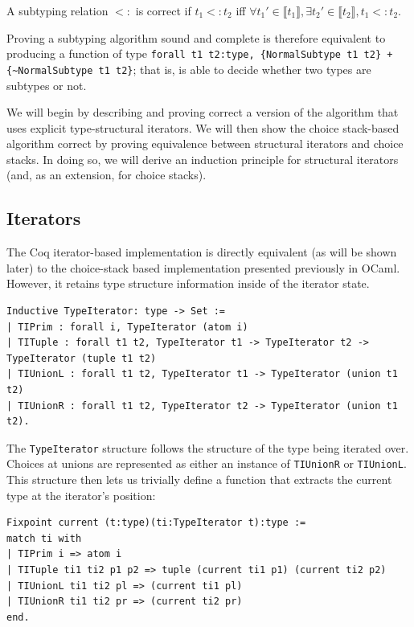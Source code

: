 \documentclass[a4paper,english]{lipics-v2019}
\newcommand{\denotes}[1]{\llbracket #1 \rrbracket}
\begin{document}
\begin{definition}
A subtyping relation $<:$ is correct if $t_1 <: t_2$ iff $\forall t_1' \in \denotes{t_1},
\exists t_2' \in \denotes{t_2}, t_1 <: t_2$.
\label{dfn:scr}
\end{definition}

Proving a subtyping algorithm sound and complete is therefore equivalent to
producing a function of type \verb|forall t1 t2:type, {NormalSubtype t1 t2} + {~NormalSubtype t1 t2}|; that is, is able to decide whether two types are
subtypes or not.

We will begin by describing and proving correct a version of the algorithm
that uses explicit type-structural iterators. We will then show the choice
stack-based algorithm correct by proving equivalence between structural
iterators and choice stacks. In doing so, we will derive an induction
principle for structural iterators (and, as an extension, for choice stacks).

\subsection{Iterators}

The Coq iterator-based implementation is directly equivalent (as will be shown
later) to the choice-stack based implementation presented previously in OCaml.
However, it retains type structure information inside of the iterator state.

\begin{small}\begin{verbatim}
Inductive TypeIterator: type -> Set :=
| TIPrim : forall i, TypeIterator (atom i)
| TITuple : forall t1 t2, TypeIterator t1 -> TypeIterator t2 -> TypeIterator (tuple t1 t2)
| TIUnionL : forall t1 t2, TypeIterator t1 -> TypeIterator (union t1 t2)
| TIUnionR : forall t1 t2, TypeIterator t2 -> TypeIterator (union t1 t2).
\end{verbatim}\end{small}

The \verb|TypeIterator| structure follows the structure of the type being
iterated over. Choices at unions are represented as either an instance of
\verb|TIUnionR| or \verb|TIUnionL|. This structure then lets us trivially
define a function that extracts the current type at the iterator's position:

\begin{small}\begin{verbatim}
Fixpoint current (t:type)(ti:TypeIterator t):type :=
match ti with
| TIPrim i => atom i
| TITuple ti1 ti2 p1 p2 => tuple (current ti1 p1) (current ti2 p2)
| TIUnionL ti1 ti2 pl => (current ti1 pl)
| TIUnionR ti1 ti2 pr => (current ti2 pr)
end.
\end{verbatim}
\end{small}
\end{document}
